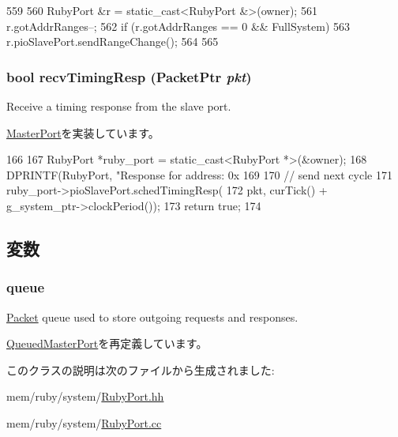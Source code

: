 \begin{DoxyCode}
559 {
560     RubyPort &r = static_cast<RubyPort &>(owner);
561     r.gotAddrRanges--;
562     if (r.gotAddrRanges == 0 && FullSystem) {
563         r.pioSlavePort.sendRangeChange();
564     }
565 }
\end{DoxyCode}
\hypertarget{classRubyPort_1_1PioMasterPort_a482dba5588f4bee43e498875a61e5e0b}{
\subsubsection[{recvTimingResp}]{\setlength{\rightskip}{0pt plus 5cm}bool recvTimingResp ({\bf PacketPtr} {\em pkt})}}
\label{classRubyPort_1_1PioMasterPort_a482dba5588f4bee43e498875a61e5e0b}
Receive a timing response from the slave port. 

\hyperlink{classMasterPort_abd323548d6c93f8b0543f1fe3a86ca35}{MasterPort}を実装しています。


\begin{DoxyCode}
166 {
167     RubyPort *ruby_port = static_cast<RubyPort *>(&owner);
168     DPRINTF(RubyPort, "Response for address: 0x%
169 
170     // send next cycle
171     ruby_port->pioSlavePort.schedTimingResp(
172             pkt, curTick() + g_system_ptr->clockPeriod());
173     return true;
174 }
\end{DoxyCode}


\subsection{変数}
\hypertarget{classRubyPort_1_1PioMasterPort_aae3ed0c3ef8ff189915e74fe401279b5}{
\subsubsection[{queue}]{ {\bf queue}}}
\label{classRubyPort_1_1PioMasterPort_aae3ed0c3ef8ff189915e74fe401279b5}
\hyperlink{classPacket}{Packet} queue used to store outgoing requests and responses. 

\hyperlink{classQueuedMasterPort_ae4e2ec83c21e5a331cecc31d84b2dbb7}{QueuedMasterPort}を再定義しています。

このクラスの説明は次のファイルから生成されました:\begin{DoxyCompactItemize}
\item 
mem/ruby/system/\hyperlink{RubyPort_8hh}{RubyPort.hh}\item 
mem/ruby/system/\hyperlink{RubyPort_8cc}{RubyPort.cc}\end{DoxyCompactItemize}
